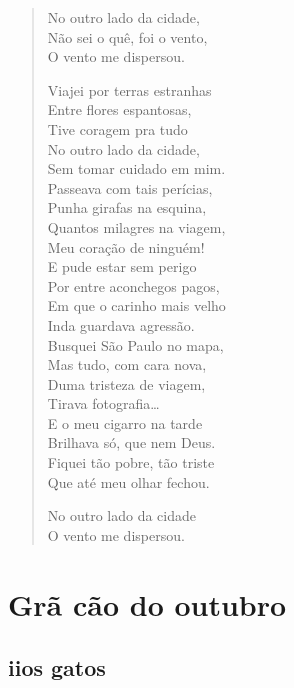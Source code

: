{

\begin{verse}
No outro lado da cidade,\\
Não sei o quê, foi o vento,\\
O vento me dispersou.

Viajei por terras estranhas\\
Entre flores espantosas,\\
Tive coragem pra tudo\\
No outro lado da cidade,\\
Sem tomar cuidado em mim.\\
Passeava com tais perícias,\\
Punha girafas na esquina,\\
Quantos milagres na viagem,\\
Meu coração de ninguém!\\
E pude estar sem perigo\\
Por entre aconchegos pagos,\\
Em que o carinho mais velho\\
Inda guardava agressão.\\
Busquei São Paulo no mapa,\\
Mas tudo, com cara nova,\\
Duma tristeza de viagem,\\
Tirava fotografia\ldots{}\\
E o meu cigarro na tarde\\
Brilhava só, que nem Deus.\\
Fiquei tão pobre, tão triste\\
Que até meu olhar fechou.

No outro lado da cidade\\
O vento me dispersou.
\end{verse}

\chapter{Grã cão do outubro}


\section*{ii\break os gatos}


}
